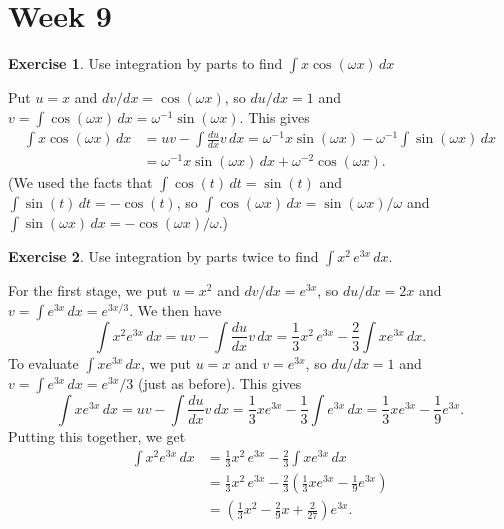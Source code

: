 \documentclass[a4paper]{amsart}
\theoremstyle{definition}
\newtheorem{exercise}{Exercise}[section]
\newenvironment{solution}{{\noindent \bf Solution:}}{}
\begin{document}
\section*{Week 9}
\addtocounter{section}{1}\setcounter{exercise}{0}

\begin{exercise}\label{ex-int-parts-ii}
Use integration by parts to find
 $\int x\cos(\omega x)\,dx$
\end{exercise}
\begin{solution}
Put $u=x$ and $dv/dx=\cos(\omega x)$, so $du/dx=1$ and
 $v=\int\cos(\omega x)\,dx=\omega^{-1}\sin(\omega x)$.  This
 gives 
 \begin{align*}
  \int x\cos(\omega x)\,dx 
   &= uv - \int \frac{du}{dx}v\,dx 
    = \omega^{-1}x\sin(\omega x) - 
      \omega^{-1}\int \sin(\omega x)\,dx \\
   &= \omega^{-1}x\sin(\omega x)\,dx +
      \omega^{-2}\cos(\omega x).
 \end{align*}
 (We used the facts that $\int\cos(t)\,dt=\sin(t)$ and
 $\int\sin(t)\,dt=-\cos(t)$, so
 $\int\cos(\omega x)\,dx=\sin(\omega x)/\omega$ and
 $\int\sin(\omega x)\,dx=-\cos(\omega x)/\omega$.)
\end{solution}
\begin{exercise}\label{ex-int-parts-i}
Use integration by parts twice to find
 $\int x^2\,e^{3x}\,dx$.
\end{exercise}
\begin{solution}
For the first stage, we put $u=x^2$ and $dv/dx=e^{3x}$, so
 $du/dx=2x$ and $v=\int e^{3x}\,dx=e^{3x/3}$.  We then have
 \[ \int x^2 e^{3x}\,dx = uv - \int \frac{du}{dx}v\,dx
     = \frac{1}{3}x^2\,e^{3x} -
       \frac{2}{3}\int x e^{3x}\,dx.
 \]
 To evaluate $\int x e^{3x}\,dx$, we put $u=x$ and
 $v=e^{3x}$, so $du/dx=1$ and $v=\int e^{3x}\,dx=e^{3x}/3$
 (just as before).  This gives 
 \[ \int x e^{3x}\,dx = uv - \int \frac{du}{dx}v\,dx 
     = \frac{1}{3}xe^{3x} - \frac{1}{3}\int e^{3x}\,dx
     = \frac{1}{3}xe^{3x} - \frac{1}{9}e^{3x}.
 \]
 Putting this together, we get
 \begin{align*}
   \int x^2 e^{3x}\,dx 
    &= \frac{1}{3}x^2\,e^{3x} -
       \frac{2}{3}\int x e^{3x}\,dx \\
    &= \frac{1}{3}x^2\,e^{3x} - \frac{2}{3}
       \left(\frac{1}{3}xe^{3x} - \frac{1}{9}e^{3x}\right) \\
    &= \left(\frac{1}{3}x^2 - \frac{2}{9}x + \frac{2}{27}\right)e^{3x}.
 \end{align*}
\end{solution}
\end{document}
